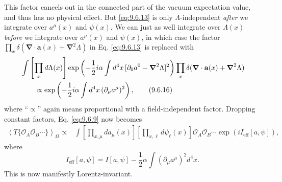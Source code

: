 This factor cancels out in the connected part of the vacuum expectation value,
and thus has no physical effect. But \eqref{eq:9.6.13} is only $\Lambda$-independent
\emph{after} we integrate over $a^\mu(x)$ and $\psi(x)$. We can just as well
integrate over $\Lambda(x)$ \emph{before} we integrate over $a^\mu(x)$ and
$\psi(x)$, in which case the factor
$\prod_x\delta(\boldsymbol\nabla\cdot\mathbf a(x)
+\boldsymbol\nabla^2\Lambda)$ in Eq. \eqref{eq:9.6.13} is replaced with
\begin{align}
&\int\left[\prod_xd\Lambda(x)\right]
 \exp\left(-\frac12i\alpha\int d^4x\,
 [\partial_0a^0-\boldsymbol\nabla^2\Lambda]^2\right)
 \prod_x\delta(\boldsymbol\nabla\cdot\mathbf a(x)
 +\boldsymbol\nabla^2\Lambda)
\notag\\
&\qquad\propto\exp\left(-\frac12i\alpha\int d^4x\,
 (\partial_\mu a^\mu)^2\right),
\tag{9.6.16}\label{eq:9.6.16}
\end{align}
where ``$\propto$'' again means proportional with a field-independent factor.
Dropping constant factors, Eq. \eqref{eq:9.6.9} now becomes
\begin{align}
\left\langle T\{\mathcal O_A\mathcal O_B\cdots\}\right\rangle_{\Omega}
\propto{}&\int\left[\prod_{x,\mu}da_\mu(x)\right]
 \left[\prod_{x,\ell}d\psi_\ell(x)\right]
 \mathcal O_A\mathcal O_B\cdots\exp(iI_{\mathrm{eff}}[a,\psi]),
\tag{9.6.17}\label{eq:9.6.17}
\end{align}
where
\begin{equation}
I_{\mathrm{eff}}[a,\psi]=I[a,\psi]
 -\frac12\alpha\int(\partial_\mu a^\mu)^2d^4x.
\tag{9.6.18}\label{eq:9.6.18}
\end{equation}
This is now manifestly Lorentz-invariant.

